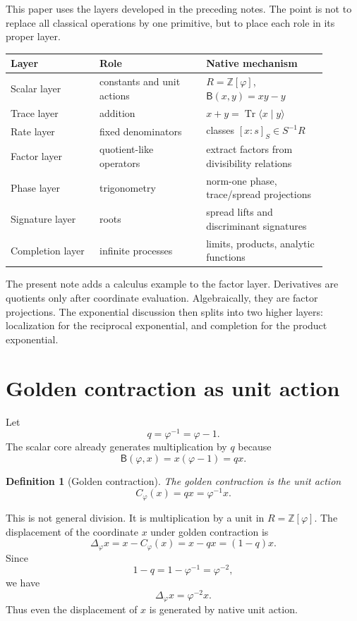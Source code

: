 \documentclass[11pt]{article}
\newtheorem{definition}{Definition}[section]
\newcommand{\B}{\mathsf{B}}
\newcommand{\Tr}{\operatorname{Tr}}
\newcommand{\ph}{\varphi}
\newcommand{\Z}{\mathbb{Z}}
\newcommand{\Del}{\Delta_{\ph}}
\newcommand{\Cph}{C_{\ph}}
\begin{document}
This paper uses the layers developed in the preceding notes.  The point is not to replace all classical operations by one primitive, but to place each role in its proper layer.

\begin{center}
\small
\begin{tabular}{p{0.25\linewidth}p{0.30\linewidth}p{0.34\linewidth}}
\toprule
Layer & Role & Native mechanism \\
\midrule
Scalar layer & constants and unit actions & $R=\Z[\ph]$, $\B(x,y)=xy-y$ \\
Trace layer & addition & $x+y=\Tr\langle x\mid y\rangle$ \\
Rate layer & fixed denominators & classes $[x:s]_S\in S^{-1}R$ \\
Factor layer & quotient-like operators & extract factors from divisibility relations \\
Phase layer & trigonometry & norm-one phase, trace/spread projections \\
Signature layer & roots & spread lifts and discriminant signatures \\
Completion layer & infinite processes & limits, products, analytic functions \\
\bottomrule
\end{tabular}
\end{center}

The present note adds a calculus example to the factor layer.  Derivatives are quotients only after coordinate evaluation.  Algebraically, they are factor projections.  The exponential discussion then splits into two higher layers: localization for the reciprocal exponential, and completion for the product exponential.

\section{Golden contraction as unit action}

Let
\[
    q=\ph^{-1}=\ph-1.
\]
The scalar core already generates multiplication by $q$ because
\[
    \B(\ph,x)=x(\ph-1)=qx.
\]

\begin{definition}[Golden contraction]
The golden contraction is the unit action
\[
    \Cph(x)=qx=\ph^{-1}x.
\]
\end{definition}

This is not general division.  It is multiplication by a unit in $R=\Z[\ph]$.  The displacement of the coordinate $x$ under golden contraction is
\[
    \Del x=x-\Cph(x)=x-qx=(1-q)x.
\]
Since
\[
    1-q=1-\ph^{-1}=\ph^{-2},
\]
we have
\[
    \Del x=\ph^{-2}x.
\]
Thus even the displacement of $x$ is generated by native unit action.
\end{document}
